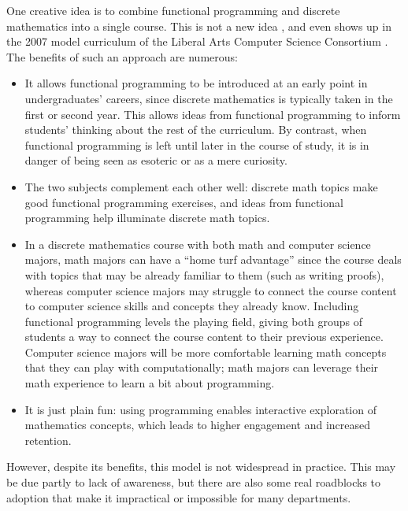 \documentclass[submission,copyright,creativecommons]{eptcs}
\begin{document}
One creative idea is to combine functional programming and discrete
mathematics into a single course.  This is not a new idea
\cite{Wainwright:1992, Henderson:2002, Scharff:2002, Doets:2004,
  ODonnell:2006, VanDrunen:2011, Xing:2008}, and even shows up
in the 2007 model curriculum of the Liberal Arts Computer Science
Consortium \cite{LiberalArtsComputerScienceConsortium:2007}. The
benefits of such an approach are numerous:
\begin{itemize}
\item It allows functional programming to be introduced at an early
  point in undergraduates' careers, since discrete mathematics is
  typically taken in the first or second year.  This allows ideas from
  functional programming to inform students' thinking about the rest
  of the curriculum.  By contrast, when functional programming is left
  until later in the course of study, it is in danger of being seen as
  esoteric or as a mere curiosity.
\item The two subjects complement each other well: discrete math
  topics make good functional programming exercises, and ideas from
  functional programming help illuminate discrete math topics.
\item In a discrete mathematics course with both math and
  computer science majors, math majors can have a ``home turf
  advantage'' since the course deals with topics that may be already
  familiar to them (such as writing proofs), whereas computer science
  majors may struggle to connect the course content to computer
  science skills and concepts they already know.  Including functional
  programming levels the playing field, giving both groups of students
  a way to connect the course content to their previous experience.
  Computer science majors will be more comfortable learning math
  concepts that they can play with computationally; math majors can
  leverage their math experience to learn a bit about programming.
\item It is just plain fun: using programming enables interactive
  exploration of mathematics concepts, which leads to higher
  engagement and increased retention.
\end{itemize}

However, despite its benefits, this model is not widespread in
practice.  This may be due partly to lack of awareness, but there are
also some real roadblocks to adoption that make it impractical or
impossible for many departments.
\end{document}

